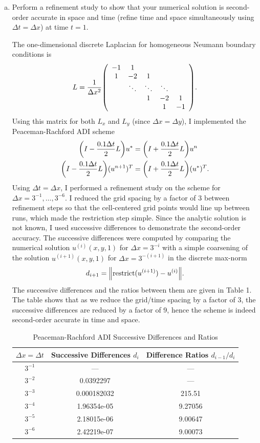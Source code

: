 \documentclass[12pt]{article}
\begin{document}
\begin{enumerate}[(a)]
\item Perform a refinement study to show that your numerical solution is second-order accurate in space and time (refine time and space simultaneously using $\Delta t = \Delta x$) at time $t=1$.

The one-dimensional discrete Laplacian for homogeneous Neumann boundary conditions is 
$$L = \dfrac{1}{\Delta x^2}\qty(\begin{array}{cccccc}
-1 & 1 &  & & \\
1 & -2 & 1 &  & \\
& \ddots & \ddots & \ddots & \\
& & 1 & -2 & 1 \\
& & & 1 & -1 \\
\end{array}).$$
Using this matrix for both $L_x$ and $L_y$ (since $\Delta x = \Delta y$), I implemented the Peaceman-Rachford ADI scheme
\begin{align*}
\qty(I - \dfrac{0.1 \Delta t}{2} L)u^* &= \qty(I + \dfrac{0.1 \Delta t}{2}L)u^n \\
\qty(I - \dfrac{0.1 \Delta t}{2} L)(u^{n+1})^T &= \qty(I + \dfrac{0.1 \Delta t}{2}L)(u^*)^T.
\end{align*}
Using $\Delta t = \Delta x$, I performed a refinement study on the scheme for $\Delta x = 3^{-1}, \dots, 3^{-6}$. I reduced the grid spacing by a factor of 3 between refinement steps so that the cell-centered grid points would line up between runs, which made the restriction step simple.  Since the analytic solution is not known, I used successive differences to demonstrate the second-order accuracy. The successive differences were computed by comparing the numerical solution $u^{(i)}(x,y,1)$ for $\Delta x = 3^{-i}$ with a simple coarsening of the solution $u^{(i+1)}(x,y,1)$ for $\Delta x = 3^{-(i+1)}$ in the discrete max-norm
$$d_{i+1} = \norm{\text{restrict}(u^{(i+1)}) - u^{(i)}}.$$
The successive differences and the ratios between them are given in Table 1.  The table shows that as we reduce the grid/time spacing by a factor of 3, the successive differences are reduced by a factor of 9, hence the scheme is indeed second-order accurate in time and space.

\begin{table}[H]
\caption{Peaceman-Rachford ADI Successive Differences and Ratios}
\centering \begin{tabular}{||c|cc||}
\hline \hline
   $\Delta x = \Delta t$ &   Successive Differences $d_i$ & Difference Ratios $d_{i-1}/d_i$ \\
\hline
$3^{-1}$  & --- & ---  \\
$3^{-2}$   &  0.0392297   &   --- \\
$3^{-3}$  &  0.000182032 &   215.51    \\
$3^{-4}$   & 1.96354e-05 &             9.27056 \\
$3^{-5}$  & 2.18015e-06 &             9.00647 \\
$3^{-6}$  &              2.42219e-07 &             9.00073 \\
\hline \hline
\end{tabular}
\end{table}



\end{enumerate}
\end{document}
